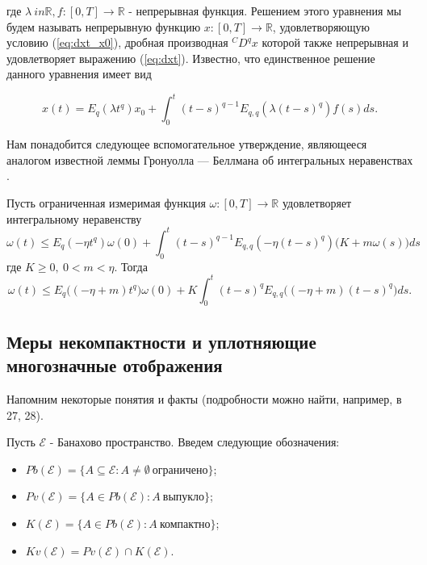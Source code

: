 \noindent где $\lambda \ in \mathbb{R}, f : [0, T] \rightarrow \mathbb{R}$ - непрерывная функция. Решением этого уравнения мы
будем называть непрерывную функцию $x : [0, T] \rightarrow \mathbb{R}$, удовлетворяющую условию (\ref{eq:dxt_x0}),
дробная производная ${}^{C}D^{q}x$ которой также непрерывная и удовлетворяет выражению (\ref{eq:dxt}). Известно, что единственное
решение данного уравнения имеет вид

\begin{equation}
    x(t) = E_{q}(\lambda t^{q})x_{0} + \int_{0}^{t} (t-s)^{q-1} E_{q,q}(\lambda(t-s)^{q})f(s)ds.
\end{equation}

Нам понадобится следующее вспомогательное утверждение, являющееся аналогом известной
леммы Гронуолла — Беллмана об интегральных неравенствах \cite{kamenskii_aa}.

\begin{lemma}
    Пусть ограниченная измеримая функция $\omega: [0, T] \rightarrow \mathbb{R}$ удовлетворяет интегральному неравенству
    \begin{equation}
        \omega(t) \leq E_{q} (-\eta t^{q}) \omega(0) + \int_{0}^{t}(t-s)^{q-1} E_{q,q}(-\eta(t-s)^{q})\Big(K + m\omega(s)\Big)ds
    \end{equation}
    где $K \geq 0, \ 0 < m < \eta$. Тогда
    \begin{equation*}
        \omega(t) \leq E_{q} \Big((-\eta+m)t^{q}\Big) \omega(0) + K \int_{0}^{t} (t-s)^{q} E_{q,q} \Big((-\eta+m)(t-s)^{q}\Big)ds.
    \end{equation*}
\end{lemma}

\subsection{Меры некомпактности и уплотняющие многозначные отображения}

Напомним некоторые понятия и факты (подробности можно найти, например, в 27, 28).

Пусть $\mathcal{E}$ - Банахово пространство. Введем следующие обозначения:

\begin{itemize}
    \item $Pb(\mathcal{E}) = \{A \subseteq \mathcal{E} : A \neq \emptyset \ \text{ограничено}\}$;
    \item $Pv(\mathcal{E}) = \{A \in Pb(\mathcal{E}) : A \ \text{выпукло}\}$;
    \item $K(\mathcal{E}) = \{A \in Pb(\mathcal{E}) : A \ \text{компактно}\}$;
    \item $Kv(\mathcal{E}) = Pv(\mathcal{E}) \cap K(\mathcal{E})$.
\end{itemize}

